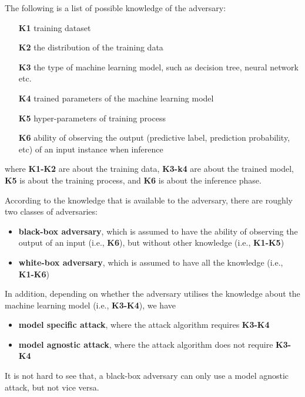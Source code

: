 The following is a list of possible knowledge of the adversary: 
%
\begin{itemize}
    \item[\textbf{K1}] training dataset
    \item[\textbf{K2}] the distribution of the training data
    \item[\textbf{K3}] the type of machine learning model, such as decision tree, neural network etc. 
    \item[\textbf{K4}] trained parameters of the machine learning model
    \item[\textbf{K5}] hyper-parameters of training process
    \item[\textbf{K6}] ability of observing the output (predictive label, prediction probability, etc) of an input instance when inference 
\end{itemize}
where \textbf{K1-K2} are about the training data, \textbf{K3-k4} are about the trained model, \textbf{K5} is about the training process, and \textbf{K6} is about the inference phase. 

According to the knowledge that is available to the adversary, there are roughly two classes of adversaries: 
\begin{itemize}
    \item \textbf{black-box adversary}, which is assumed to have the ability of observing the output of an input (i.e., \textbf{K6}), but without other knowledge (i.e., \textbf{K1-K5})
    \item \textbf{white-box adversary}, which is assumed to have all the  knowledge (i.e., \textbf{K1-K6})
\end{itemize}

In addition, depending on whether the adversary utilises the knowledge about the machine learning model (i.e., \textbf{K3-K4}), we have 
\begin{itemize}
    \item \textbf{model specific attack}, where the attack algorithm requires \textbf{K3-K4}
    \item \textbf{model agnostic attack}, where the attack algorithm does not require \textbf{K3-K4}
\end{itemize}
It is not hard to see that, a black-box adversary can only use a model agnostic attack, but not vice versa. 
